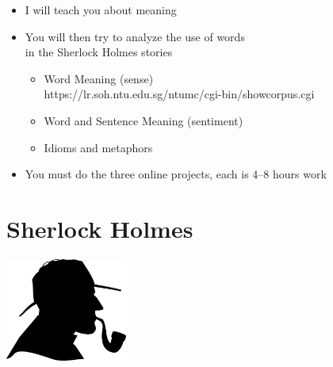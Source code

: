 \documentclass[a4paper,landscape,headrule,footrule,xetex,25pt]{foils}
\begin{document}
\begin{itemize}
\item I will teach you about meaning
\item You will then try to analyze the use of words 
  \\ in the Sherlock Holmes stories
  \begin{itemize}
  \item Word Meaning (sense)
    \\   https://lr.soh.ntu.edu.sg/ntumc/cgi-bin/showcorpus.cgi
    \\  
  \item Word and Sentence Meaning (sentiment)
    \\  
  \item Idioms and metaphors
    \\ 
  \end{itemize}
\item You must do the three online projects, each is 4--8 hours work

\end{itemize}











\section{Sherlock Holmes}
\begin{center}
  \includegraphics[width=0.3\textwidth]{pics/detectiveprofile}
\end{center}
\end{document}
